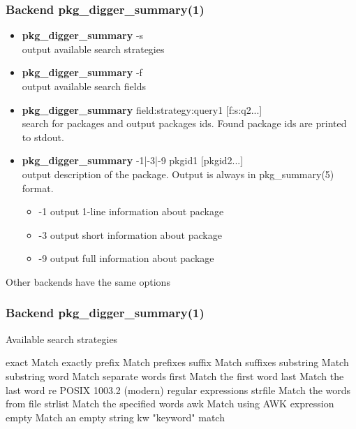 \documentclass[hyperref=unicode,ascii,xcolor=dvipsnames]{beamer}
\begin{document}
\begin{frame}[fragile]
  \frametitle{Backend pkg\_digger\_summary(1)}
  \begin{itemize}
  \item {\bf pkg\_digger\_summary} -s\\
    output available search strategies
  \item {\bf pkg\_digger\_summary} -f\\
    output available search fields
  \item {\bf pkg\_digger\_summary} field:strategy:query1 [f:s:q2...]\\
    search for packages and output packages ids.
    Found package ids are printed to stdout.
  \item {\bf pkg\_digger\_summary} -1|-3|-9 pkgid1 [pkgid2...]\\
    output description of the package. Output is always in pkg\_summary(5) format.
    \begin{itemize}
    \item -1         output 1-line information about package
    \item -3         output short information about package
    \item -9         output full information about package
    \end{itemize}
  \end{itemize}
  Other backends have the same options
\end{frame}


\begin{frame}[fragile]
  \frametitle{Backend pkg\_digger\_summary(1)}
  \begin{block}{Available search strategies}
    \begin{Code}{}
exact   Match exactly
prefix  Match prefixes
suffix  Match suffixes
substring       Match substring
word    Match separate words
first   Match the first word
last    Match the last word
re      POSIX 1003.2 (modern) regular expressions
strfile Match the words from file
strlist Match the specified words
awk     Match using AWK expression
empty   Match an empty string
kw      "keyword" match
\prompt{#}
    \end{Code}
  \end{block}
\end{frame}

\end{document}
